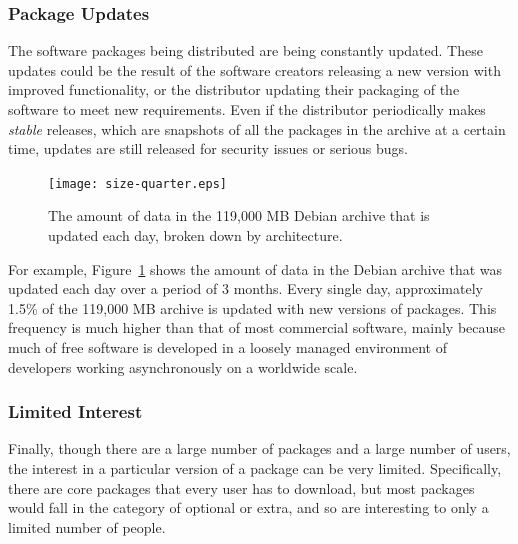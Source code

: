 \documentclass[conference]{IEEEtran}
\begin{document}
\subsubsection{Package Updates}

The software packages being distributed are being constantly
updated. These updates could be the result of the software creators
releasing a new version with improved functionality,
or the distributor updating their packaging of the
software to meet new requirements. Even if the distributor
periodically makes \emph{stable} releases, which are snapshots of
all the packages in the archive at a certain time, updates are still
released for security issues or serious bugs.

\begin{figure}
\centering
\texttt{[image: size-quarter.eps]}
\caption{The amount of data in the 119,000 MB Debian archive that is
updated each day, broken down by architecture.}
\label{update_size}
\end{figure}

For example, Figure~\ref{update_size} shows the amount of data in
the Debian archive that was updated each day over a period of 3
months. Every single day, approximately 1.5\% of the 119,000 MB archive is
updated with new versions of packages. This frequency is much higher than
that of most commercial software, mainly because much of free software is
developed in a loosely managed environment of developers working
asynchronously on a worldwide scale.

\subsubsection{Limited Interest}

Finally, though there are a large number of packages and a large number of
users, the interest in a particular version of a package can be very 
limited. Specifically, there are core packages that every user has to download, but most
packages would fall in the category of optional or extra, and so are
interesting to only a limited number of people.
\end{document}
